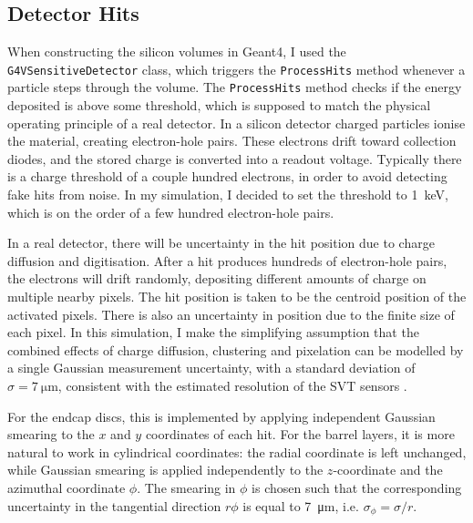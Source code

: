 \documentclass[titlepage]{article}[11pt]
\begin{document}
\subsection{Detector Hits}
When constructing the silicon volumes in Geant4, I used the \verb|G4VSensitiveDetector| class, which triggers the \verb|ProcessHits| method whenever a particle steps through the volume. The \verb|ProcessHits| method checks if the energy deposited is above some threshold, which is supposed to match the physical operating principle of a real detector. In a silicon detector charged particles ionise the material, creating electron-hole pairs. These electrons drift toward collection diodes, and the stored charge is converted into a readout voltage. Typically there is a charge threshold of a couple hundred electrons, in order to avoid detecting fake hits from noise. In my simulation, I decided to set the threshold to \qty{1}{\kilo \electronvolt}, which is on the order of a few hundred electron-hole pairs. 

In a real detector, there will be uncertainty in the hit position due to charge diffusion and digitisation. After a hit produces hundreds of electron-hole pairs, the electrons will drift randomly, depositing different amounts of charge on multiple nearby pixels. The hit position is taken to be the centroid position of the activated pixels. There is also an uncertainty in position due to the finite size of each pixel. In this simulation, I make the simplifying assumption that the combined effects of charge diffusion, clustering and pixelation can be modelled by a single Gaussian measurement uncertainty, with a standard deviation of $\sigma=\qty{7}{\micro \metre}$, consistent with the estimated resolution of the SVT sensors \cite{turrisi2026epicsiliconvertextracker}. 

For the endcap discs, this is implemented by applying independent Gaussian smearing to the $x$ and $y$ coordinates of each hit. For the barrel layers, it is more natural to work in cylindrical coordinates: the radial coordinate is left unchanged, while Gaussian smearing is applied independently to the $z$-coordinate and the azimuthal coordinate $\phi$. The smearing in $\phi$ is chosen such that the corresponding uncertainty in the tangential direction $r \phi$ is equal to \qty{7}{\micro \metre}, i.e. $\sigma_\phi = \sigma / r$.
\end{document}
